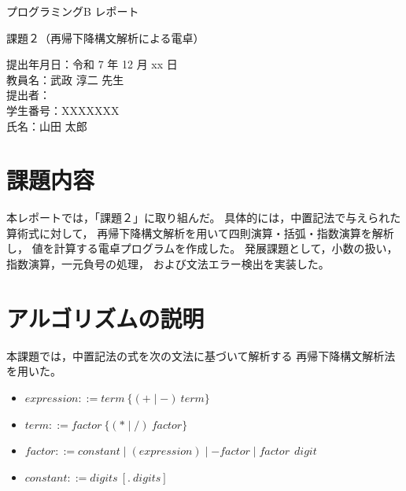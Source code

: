 \documentclass[a4paper,12pt]{jsarticle}
\begin{document}
\begin{titlepage}
\centering

\vspace*{4cm}

{\Large プログラミングB レポート \par}
\vspace{1cm}

{\Large 課題２（再帰下降構文解析による電卓）\par}

\vspace{3cm}

提出年月日：令和 7 年 12 月 xx 日 \\
教員名：武政 淳二 先生 \\[1cm]

提出者：\\
学生番号：XXXXXXX \\
氏名：山田 太郎

\end{titlepage}
\setcounter{page}{1}

\section{課題内容}

本レポートでは，「課題２」に取り組んだ。
具体的には，中置記法で与えられた算術式に対して，
再帰下降構文解析を用いて四則演算・括弧・指数演算を解析し，
値を計算する電卓プログラムを作成した。%
発展課題として，小数の扱い，指数演算，一元負号の処理，
および文法エラー検出を実装した。

\section{アルゴリズムの説明}

本課題では，中置記法の式を次の文法に基づいて解析する
再帰下降構文解析法を用いた。

\begin{itemize}
    \item $expression ::= term \ \{ (+ \mid -)\ term \}$
    \item $term ::= factor\ \{ (* \mid /)\ factor \}$
    \item $factor ::= constant \mid (expression) \mid -factor \mid factor\ ^\ digit$
    \item $constant ::= digits\ [.\ digits]$
\end{itemize}
\end{document}
